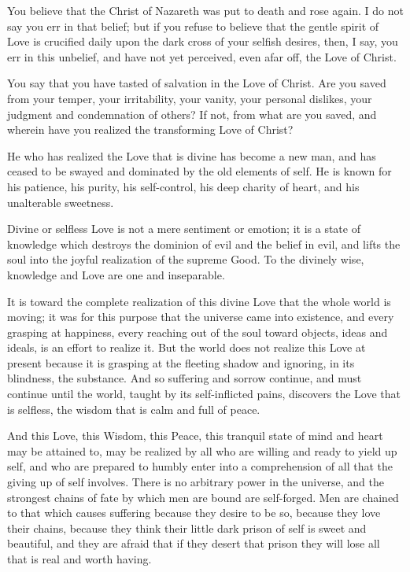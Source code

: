 \documentclass[12pt,oneside]{scrbook}
\begin{document}
  You believe that the Christ of Nazareth was put to death and rose again.
  I do not say you err in that belief; but if you refuse to believe that
  the gentle spirit of Love is crucified daily upon the dark cross of your
  selfish desires, then, I say, you err in this unbelief, and have not yet
  perceived, even afar off, the Love of Christ.
  
  You say that you have tasted of salvation in the Love of Christ. Are you
  saved from your temper, your irritability, your vanity, your personal
  dislikes, your judgment and condemnation of others? If not, from what
  are you saved, and wherein have you realized the transforming Love of
  Christ?
  
  He who has realized the Love that is divine has become a new man, and
  has ceased to be swayed and dominated by the old elements of self. He is
  known for his patience, his purity, his self-control, his deep charity
  of heart, and his unalterable sweetness.
  
  Divine or selfless Love is not a mere sentiment or emotion; it is a
  state of knowledge which destroys the dominion of evil and the belief in
  evil, and lifts the soul into the joyful realization of the supreme
  Good. To the divinely wise, knowledge and Love are one and inseparable.
  
  It is toward the complete realization of this divine Love that the whole
  world is moving; it was for this purpose that the universe came into
  existence, and every grasping at happiness, every reaching out of the
  soul toward objects, ideas and ideals, is an effort to realize it. But
  the world does not realize this Love at present because it is grasping
  at the fleeting shadow and ignoring, in its blindness, the substance.
  And so suffering and sorrow continue, and must continue until the world,
  taught by its self-inflicted pains, discovers the Love that is selfless,
  the wisdom that is calm and full of peace.
  
  And this Love, this Wisdom, this Peace, this tranquil state of mind and
  heart may be attained to, may be realized by all who are willing and
  ready to yield up self, and who are prepared to humbly enter into a
  comprehension of all that the giving up of self involves. There is no
  arbitrary power in the universe, and the strongest chains of fate by
  which men are bound are self-forged. Men are chained to that which
  causes suffering because they desire to be so, because they love their
  chains, because they think their little dark prison of self is sweet and
  beautiful, and they are afraid that if they desert that prison they will
  lose all that is real and worth having.
  
\end{document}
